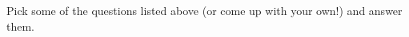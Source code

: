 \documentclass[nooutcomes]{ximera}
\begin{document}
\begin{problem}
  Pick some of the questions listed above (or come up with your own!) and answer them.
\end{problem}






\end{document}
